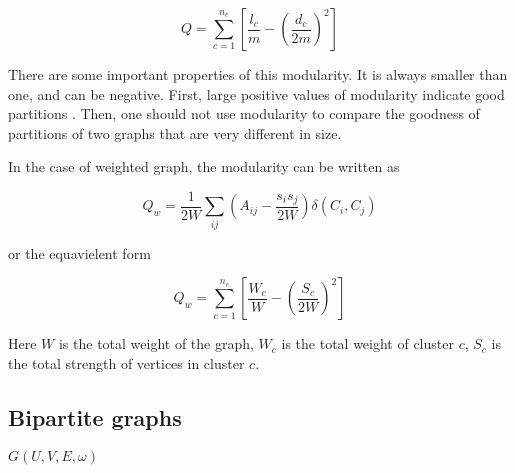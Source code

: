 \begin{equation}
	Q = \sum_{c=1}^{n_c} \left[\frac{l_c}{m} - \left(\frac{d_c}{2m}\right)^2 \right]
\end{equation}

There are some important properties of this modularity.
It is always smaller than one, and can be negative.
First, large positive values of modularity indicate good partitions \cite{fortunato2010}.
Then, one should not use modularity to compare the goodness of partitions of two graphs that are very different in size.

In the case of weighted graph, the modularity can be written as

\begin{equation}
	Q_w = \frac{1}{2W} \sum_{ij} \left(A_{ij} - \frac{s_i s_j}{2W}\right) \delta(C_i, C_j)
\end{equation}

or the equavielent form

\begin{equation}
	Q_w = \sum_{c=1}^{n_c} \left[\frac{W_c}{W} - \left(\frac{S_c}{2W}\right)^2 \right]
\end{equation}

Here $W$ is the total weight of the graph, $W_c$ is the total weight of cluster $c$,
$S_c$ is the total strength of vertices in cluster $c$.



\subsection{Bipartite graphs}

$G(U, V, E, \omega)$



